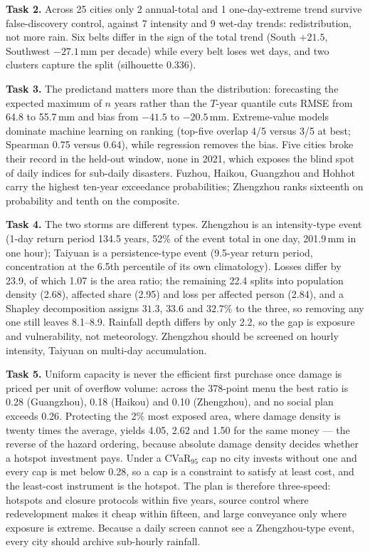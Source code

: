 \textbf{Task 2.} Across 25 cities only 2 annual-total and 1 one-day-extreme trend survive false-discovery control, against 7 intensity and 9 wet-day trends: redistribution, not more rain. Six belts differ in the sign of the total trend (South $+21.5$, Southwest $-27.1$\,mm per decade) while every belt loses wet days, and two clusters capture the split (silhouette 0.336).

\textbf{Task 3.} The predictand matters more than the distribution: forecasting the expected maximum of $n$ years rather than the $T$-year quantile cuts RMSE from 64.8 to 55.7\,mm and bias from $-41.5$ to $-20.5$\,mm. Extreme-value models dominate machine learning on ranking (top-five overlap 4/5 versus 3/5 at best; Spearman 0.75 versus 0.64), while regression removes the bias. Five cities broke their record in the held-out window, none in 2021, which exposes the blind spot of daily indices for sub-daily disasters. Fuzhou, Haikou, Guangzhou and Hohhot carry the highest ten-year exceedance probabilities; Zhengzhou ranks sixteenth on probability and tenth on the composite.

\textbf{Task 4.} The two storms are different types. Zhengzhou is an intensity-type event (1-day return period 134.5 years, 52\% of the event total in one day, 201.9\,mm in one hour); Taiyuan is a persistence-type event (9.5-year return period, concentration at the 6.5th percentile of its own climatology). Losses differ by 23.9, of which 1.07 is the area ratio; the remaining 22.4 splits into population density (2.68), affected share (2.95) and loss per affected person (2.84), and a Shapley decomposition assigns $31.3$, $33.6$ and $32.7\%$ to the three, so removing any one still leaves 8.1--8.9. Rainfall depth differs by only 2.2, so the gap is exposure and vulnerability, not meteorology. Zhengzhou should be screened on hourly intensity, Taiyuan on multi-day accumulation.

\textbf{Task 5.} Uniform capacity is never the efficient first purchase once damage is priced per unit of overflow volume: across the 378-point menu the best ratio is 0.28 (Guangzhou), 0.18 (Haikou) and 0.10 (Zhengzhou), and no social plan exceeds 0.26. Protecting the 2\% most exposed area, where damage density is twenty times the average, yields 4.05, 2.62 and 1.50 for the same money --- the reverse of the hazard ordering, because absolute damage density decides whether a hotspot investment pays. Under a CVaR$_{95}$ cap no city invests without one and every cap is met below 0.28, so a cap is a constraint to satisfy at least cost, and the least-cost instrument is the hotspot. The plan is therefore three-speed: hotspots and closure protocols within five years, source control where redevelopment makes it cheap within fifteen, and large conveyance only where exposure is extreme. Because a daily screen cannot see a Zhengzhou-type event, every city should archive sub-hourly rainfall.